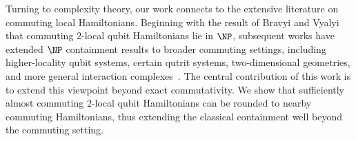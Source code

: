\documentclass[11pt]{article}
\theoremstyle{plain}
\newcommand{\IslamNote}[1]{\textcolor{orange}{(Islam: #1)}}
\newcommand{\IslamNote}[1]{}
\begin{document}
Turning to complexity theory, our work connects to the extensive literature
on commuting local Hamiltonians.  Beginning with the result of Bravyi and
Vyalyi~\cite{bravyi2004commutativeversionklocalhamiltonian} that commuting
$2$-local qubit Hamiltonians lie in $\NP$, subsequent works have extended
$\NP$ containment results to broader commuting settings, including
higher-locality qubit systems, certain qutrit systems, two-dimensional
geometries, and more general interaction complexes~\cite{aharonov2011complexity,schuch2011complexitycommutinghamiltonianssquare,AKV,irani2023commutinglocalhamiltonianproblem,bostanci2025commutinglocalhamiltonians2d}.
The central contribution of this work is to extend this viewpoint beyond
exact commutativity.  We show that sufficiently almost commuting $2$-local
qubit Hamiltonians can be rounded to nearby commuting Hamiltonians, thus
extending the classical containment well beyond the commuting setting.






\end{document}
